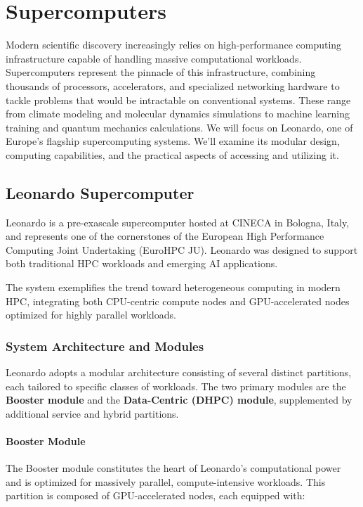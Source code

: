 \chapter{Supercomputers}

Modern scientific discovery increasingly relies on high-performance computing infrastructure capable of handling massive computational workloads. Supercomputers represent the pinnacle of this infrastructure, combining thousands of processors, accelerators, and specialized networking hardware to tackle problems that would be intractable on conventional systems. These range from climate modeling and molecular dynamics simulations to machine learning training and quantum mechanics calculations.
We will focus on Leonardo, one of Europe's flagship supercomputing systems. We'll examine its modular design, computing capabilities, and the practical aspects of accessing and utilizing it.

\section{Leonardo Supercomputer}

Leonardo is a pre-exascale supercomputer hosted at CINECA in Bologna, Italy, and represents one of the cornerstones of the European High Performance Computing Joint Undertaking (EuroHPC JU). Leonardo was designed to support both traditional HPC workloads and emerging AI applications.

The system exemplifies the trend toward heterogeneous computing in modern HPC, integrating both CPU-centric compute nodes and GPU-accelerated nodes optimized for highly parallel workloads.

\subsection{System Architecture and Modules}

Leonardo adopts a modular architecture consisting of several distinct partitions, each tailored to specific classes of workloads. The two primary modules are the \textbf{Booster module} and the \textbf{Data-Centric (DHPC) module}, supplemented by additional service and hybrid partitions.

\subsubsection{Booster Module}

The Booster module constitutes the heart of Leonardo's computational power and is optimized for massively parallel, compute-intensive workloads. This partition is composed of GPU-accelerated nodes, each equipped with:

